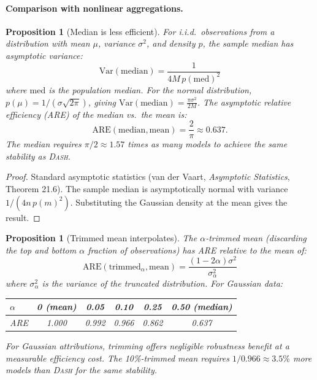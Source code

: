 \documentclass{article}
\newtheorem{proposition}[theorem]{Proposition}
\newcommand{\Var}{\mathrm{Var}}
\newcommand{\DASH}{\textsc{Dash}}
\begin{document}
\paragraph{Comparison with nonlinear aggregations.}

\begin{proposition}[Median is less efficient]
\label{prop:median}
For i.i.d.\ observations from a distribution with mean $\mu$,
variance $\sigma^2$, and density $p$, the sample median has
asymptotic variance:
\[
    \Var(\text{median}) = \frac{1}{4M\, p(\text{med})^2}
\]
where $\text{med}$ is the population median.
For the normal distribution, $p(\mu) = 1/(\sigma\sqrt{2\pi})$,
giving $\Var(\text{median}) = \frac{\pi\sigma^2}{2M}$.
The asymptotic relative efficiency (ARE) of the median vs.\
the mean is:
\[
    \text{ARE}(\text{median}, \text{mean}) = \frac{2}{\pi} \approx 0.637.
\]
The median requires $\pi/2 \approx 1.57$ times as many models to
achieve the same stability as \DASH{}.
\end{proposition}

\begin{proof}
Standard asymptotic statistics (van der Vaart, \emph{Asymptotic
Statistics}, Theorem 21.6). The sample median is asymptotically
normal with variance $1/(4n\,p(m)^2)$. Substituting the Gaussian
density at the mean gives the result.
\end{proof}

\begin{proposition}[Trimmed mean interpolates]
\label{prop:trimmed}
The $\alpha$-trimmed mean (discarding the top and bottom $\alpha$
fraction of observations) has ARE relative to the mean of:
\[
    \text{ARE}(\text{trimmed}_\alpha, \text{mean}) =
    \frac{(1-2\alpha)\sigma^2}{\sigma^2_\alpha}
\]
where $\sigma^2_\alpha$ is the variance of the truncated distribution.
For Gaussian data:
\begin{center}
\small
\begin{tabular}{@{}lccccc@{}}
\toprule
$\alpha$ & 0 (mean) & 0.05 & 0.10 & 0.25 & 0.50 (median) \\
\midrule
ARE & 1.000 & 0.992 & 0.966 & 0.862 & 0.637 \\
\bottomrule
\end{tabular}
\end{center}
For Gaussian attributions, trimming offers negligible robustness
benefit at a measurable efficiency cost. The 10\%-trimmed mean
requires $1/0.966 \approx 3.5\%$ more models than \DASH{} for the
same stability.
\end{proposition}
\end{document}
